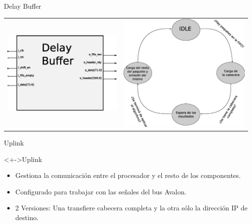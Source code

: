 \documentclass[xcolor=dvipsnames]{beamer}
\begin{document}
\begin{frame}{Delay Buffer}
 \begin{tabularx}{\linewidth}{Z|Z}
    \includegraphics[scale=0.40]{figures/bloqdelaybuffer.eps} 
    &
    \includegraphics[scale=0.25]{figures/estdelay.eps}
    \\
  \end{tabularx}

\end{frame}



\begin{frame}{Uplink}
 \begin{block}<+->{Uplink}
	\begin{itemize}
      \scriptsize
	\item Gestiona la comunicación entre el procesador y el resto de los componentes.
	\item Configurado para trabajar con las señales del bus Avalon.
	\item 2 Versiones: Una transfiere cabecera completa y la otra sólo la dirección IP de destino.
	
	   \end{itemize}
\end{block}
\end{frame}
\end{document}
